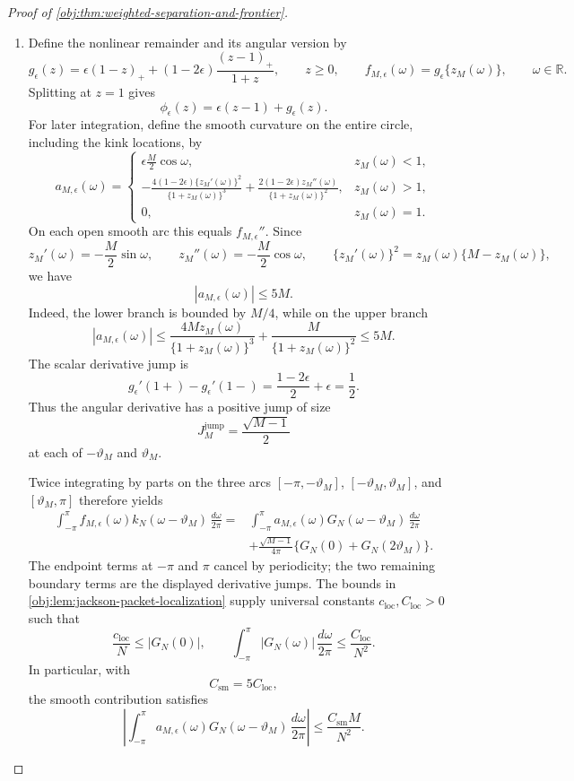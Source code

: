 \documentclass[11pt]{article}
\begin{document}
\begin{proof}[Proof of \cref{obj:thm:weighted-separation-and-frontier}]
\begin{enumerate}
\item
Define the nonlinear remainder and its angular version by
\[
g_\epsilon(z)
=\epsilon(1-z)_+
 +(1-2\epsilon)\frac{(z-1)_+}{1+z},
\qquad z\ge0,
\qquad
f_{M,\epsilon}(\omega)=g_\epsilon\{z_M(\omega)\},
\qquad \omega\in\mathbb R.
\]
Splitting at \(z=1\) gives
\[
\phi_\epsilon(z)=\epsilon(z-1)+g_\epsilon(z).
\]
For later integration, define the smooth curvature on the entire circle, including the kink locations, by
\[
a_{M,\epsilon}(\omega)=
\begin{cases}
\displaystyle \epsilon\frac M2\cos\omega,
&z_M(\omega)<1,\\[4pt]
\displaystyle
-\frac{4(1-2\epsilon)\{z_M'(\omega)\}^2}
       {\{1+z_M(\omega)\}^3}
+\frac{2(1-2\epsilon)z_M''(\omega)}
       {\{1+z_M(\omega)\}^2},
&z_M(\omega)>1,\\[6pt]
0,&z_M(\omega)=1.
\end{cases}
\]
On each open smooth arc this equals \(f_{M,\epsilon}''\). Since
\[
z_M'(\omega)=-\frac M2\sin\omega,
\qquad
z_M''(\omega)=-\frac M2\cos\omega,
\qquad
\{z_M'(\omega)\}^2=z_M(\omega)\{M-z_M(\omega)\},
\]
we have
\[
|a_{M,\epsilon}(\omega)|\le5M.
\]
Indeed, the lower branch is bounded by \(M/4\), while on the upper branch
\[
|a_{M,\epsilon}(\omega)|
\le
\frac{4Mz_M(\omega)}{\{1+z_M(\omega)\}^3}
+\frac{M}{\{1+z_M(\omega)\}^2}
\le5M.
\]
The scalar derivative jump is
\[
g_\epsilon'(1+)-g_\epsilon'(1-)
=\frac{1-2\epsilon}{2}+\epsilon=\frac12.
\]
Thus the angular derivative has a positive jump of size
\[
J_M^{\mathrm{jump}}=\frac{\sqrt{M-1}}2
\]
at each of \(-\vartheta_M\) and \(\vartheta_M\).

Twice integrating by parts on the three arcs
\([-\pi,-\vartheta_M]\), \([-\vartheta_M,\vartheta_M]\), and
\([\vartheta_M,\pi]\) therefore yields
\[
\begin{aligned}
\int_{-\pi}^{\pi}
f_{M,\epsilon}(\omega)k_N(\omega-\vartheta_M)\,\frac{d\omega}{2\pi}
={}&
\int_{-\pi}^{\pi}
a_{M,\epsilon}(\omega)G_N(\omega-\vartheta_M)\,
\frac{d\omega}{2\pi}\\
&+\frac{\sqrt{M-1}}{4\pi}
 \{G_N(0)+G_N(2\vartheta_M)\}.
\end{aligned}
\]
The endpoint terms at \(-\pi\) and \(\pi\) cancel by periodicity; the two remaining boundary terms are the displayed derivative jumps. The bounds in
\cref{obj:lem:jackson-packet-localization} supply universal constants
\(c_{\mathrm{loc}},C_{\mathrm{loc}}>0\) such that
\[
\frac{c_{\mathrm{loc}}}{N}\le|G_N(0)|,
\qquad
\int_{-\pi}^{\pi}|G_N(\omega)|\,\frac{d\omega}{2\pi}
\le\frac{C_{\mathrm{loc}}}{N^2}.
\]
In particular, with
\[
C_{\mathrm{sm}}=5C_{\mathrm{loc}},
\]
the smooth contribution satisfies
\[
\left|
\int_{-\pi}^{\pi}
a_{M,\epsilon}(\omega)G_N(\omega-\vartheta_M)\,
\frac{d\omega}{2\pi}
\right|
\le\frac{C_{\mathrm{sm}}M}{N^2}.
\]


\end{enumerate}
\end{proof}
\end{document}
